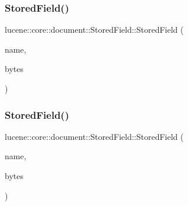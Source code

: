 \mbox{\label{classlucene_1_1core_1_1document_1_1StoredField_a1ba2644316f53aaafc62325bf5c1ac91}} 
\subsubsection{\texorpdfstring{Stored\+Field()}{StoredField()}\hspace{0.1cm}{\footnotesize\ttfamily [6/15]}}
{\footnotesize\ttfamily lucene\+::core\+::document\+::\+Stored\+Field\+::\+Stored\+Field (\begin{DoxyParamCaption}\item[{\mbox{\hyperlink{ZlibCrc32_8h_a2c212835823e3c54a8ab6d95c652660e}{const}} std\+::string \&}]{name,  }\item[{\mbox{\hyperlink{ZlibCrc32_8h_a2c212835823e3c54a8ab6d95c652660e}{const}} \mbox{\hyperlink{classlucene_1_1core_1_1util_1_1BytesRef}{lucene\+::core\+::util\+::\+Bytes\+Ref}} \&}]{bytes }\end{DoxyParamCaption})\hspace{0.3cm}{\ttfamily [inline]}}

\mbox{\label{classlucene_1_1core_1_1document_1_1StoredField_a12f49339f0b54b01c39e76ac3e0d2505}} 
\subsubsection{\texorpdfstring{Stored\+Field()}{StoredField()}\hspace{0.1cm}{\footnotesize\ttfamily [7/15]}}
{\footnotesize\ttfamily lucene\+::core\+::document\+::\+Stored\+Field\+::\+Stored\+Field (\begin{DoxyParamCaption}\item[{\mbox{\hyperlink{ZlibCrc32_8h_a2c212835823e3c54a8ab6d95c652660e}{const}} std\+::string \&}]{name,  }\item[{\mbox{\hyperlink{classlucene_1_1core_1_1util_1_1BytesRef}{lucene\+::core\+::util\+::\+Bytes\+Ref}} \&\&}]{bytes }\end{DoxyParamCaption})\hspace{0.3cm}{\ttfamily [inline]}}

